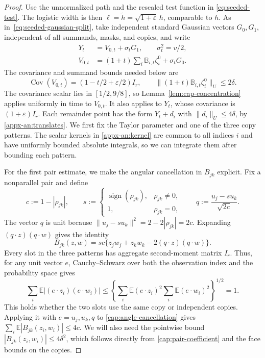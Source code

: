 \documentclass[11pt,letterpaper]{article}
\theoremstyle{remark}
\newcommand{\E}{\mathbb E}
\newcommand{\Cov}{\operatorname{Cov}}
\begin{document}
\begin{proof}
Use the unnormalized path and the rescaled test function in
\eqref{eq:seeded-test}. The logistic width is then
$\ell=\widetilde h=\sqrt{1+\varepsilon}\,h$, comparable to $h$.
As in~\eqref{eq:seeded-gaussian-split}, take independent standard
Gaussian vectors $G_0,G_1$, independent of all summands, masks,
and copies, and write
\[
 \begin{aligned}
 Y_t&=V_{0,t}+\sigma_tG_1,\qquad \sigma_t^2=v/2,\\
 V_{0,t}&=(1+t)\sum_i\mathbb B_{i,t}\zeta_i^0+\sigma_tG_0.
 \end{aligned}
\]
The covariance and summand bounds needed below are
\[
 \Cov(V_{0,t})=(1-t/2+\varepsilon/2)I_r,
 \qquad \|(1+t)\mathbb B_{i,t}\zeta_i^0\|_U\le2\delta.
\]
The covariance scalar lies in $[1/2,9/8]$, so
Lemma~\ref{lem:cap-concentration} applies uniformly in time
to $V_{0,t}$. It also applies to $Y_t$, whose covariance is
$(1+\varepsilon)I_r$. Each remainder point has the form
$Y_t+d_i$ with $\|d_i\|_U\le4\delta$, by
\eqref{appx-an:translates}. We first fix the Taylor parameter
and one of the three copy patterns. The scalar kernels in
\eqref{appx-an:kernel} are common to all indices $i$ and have
uniformly bounded absolute integrals, so we can integrate them
after bounding each pattern.

For the first pair estimate, we make the angular cancellation
in $B_{jk}$ explicit. Fix a nonparallel pair and define
\[
 c:=1-|\rho_{jk}|,\qquad
 s:=\begin{cases}\operatorname{sign}(\rho_{jk}),&\rho_{jk}\ne0,\\
                 1,&\rho_{jk}=0,\end{cases}
 \qquad q:=\frac{u_j-su_k}{\sqrt{2c}}.
\]
The vector $q$ is unit because
$\|u_j-su_k\|^2=2-2|\rho_{jk}|=2c$.
Expanding $(q\cdot z)(q\cdot w)$ gives the identity
\begin{equation}
 B_{jk}(z,w)=sc\{z_jw_j+z_kw_k-2(q\cdot z)(q\cdot w)\}.
 \label{cap:angle-cancellation}
\end{equation}
Every slot in the three patterns has aggregate second-moment
matrix $I_r$. Thus, for any unit vector $e$, Cauchy--Schwarz
over both the observation index and the probability space gives
\[
 \sum_i\E|(e\cdot z_i)(e\cdot w_i)|
 \le\left\{\sum_i\E(e\cdot z_i)^2
             \sum_i\E(e\cdot w_i)^2\right\}^{1/2}=1.
\]
This holds whether the two slots use the same copy or independent
copies. Applying it with $e=u_j,u_k,q$ to
\eqref{cap:angle-cancellation} gives
$\sum_i\E|B_{jk}(z_i,w_i)|\le4c$.
We will also need the pointwise bound
$|B_{jk}(z_i,w_i)|\le4\delta^2$, which follows directly from
\eqref{cap:pair-coefficient} and the face bounds on the copies.


\end{proof}
\end{document}
